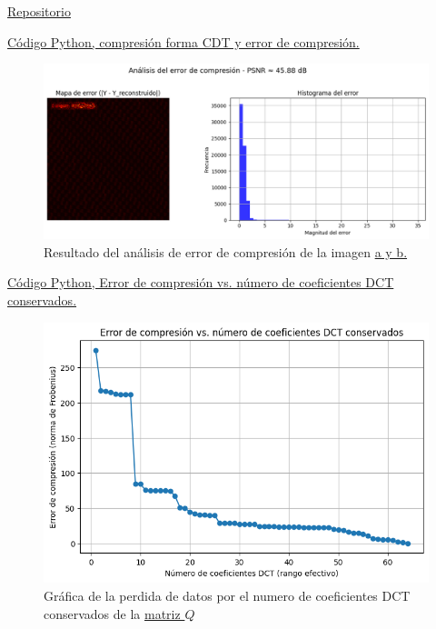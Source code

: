 \documentclass[8pt,a4paper]{article}
\theoremstyle{definition}
\theoremstyle{remark}
\begin{document}
\begin{multicols}{2}
    \begin{flushleft}
    
         \item\textcolor{blue}{\href{https://github.com/AlvA-AlvA-01/compresion_jpg.git}{Repositorio}}

\vspace{1em}

         \item\textcolor{blue}{\href{https://colab.research.google.com/drive/1lGXB7AodEpYaurUzqtMokQTkveHA1I1E}{Código Python, compresión forma CDT y error de compresión.}}

         \begin{figure}[H]
                \centering
                \includegraphics[width=0.9\linewidth]{codigo1.png}
                \caption*{Resultado del análisis de error de compresión de la imagen 
                    \textcolor{blue}{\hyperref[fig:original]{a y b.}}}
            \end{figure}

\vspace{1em}

         \item\textcolor{blue}{\href{https://colab.research.google.com/drive/16i22DwAQEefmN9jHfF1v3YCU5J3PY7jS}{Código Python, Error de compresión vs. número de coeficientes DCT conservados.}}

        \begin{figure}[H]
                \centering
                \includegraphics[width=0.9\linewidth]{codigo2.png}
                \captionsetup{skip=2pt}
                \caption*{Gráfica de la perdida de datos por el numero de coeficientes DCT conservados de la 
                \textcolor{blue}{\hyperref[matriz:Q]{matriz \( Q \)}}}
            \end{figure}
         

\end{flushleft}
\end{multicols}
\end{document}
